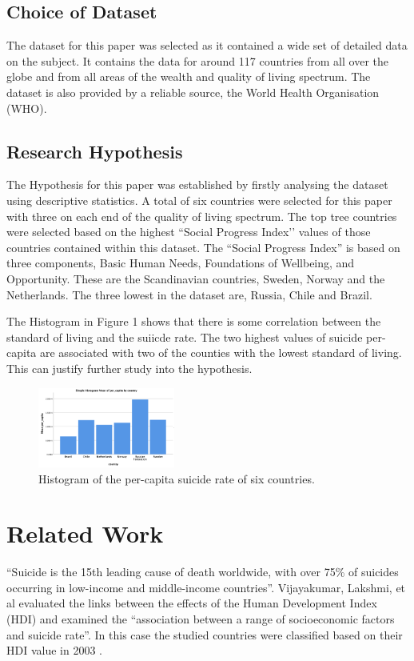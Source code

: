 \documentclass[conference]{IEEEtran}
\begin{document}
\subsection{Choice of Dataset}
The dataset for this paper was selected as it contained a wide set of detailed data on the subject.
It contains the data for around 117 countries from all over the globe and from all areas of the wealth and quality of living spectrum.
The dataset is also provided by a reliable source, the World Health Organisation (WHO).

\subsection{Research Hypothesis}
The Hypothesis for this paper was established by firstly analysing the dataset using descriptive statistics.
A total of six countries were selected for this paper with three on each end of the quality of living spectrum.
The top tree countries were selected based on the highest ``Social Progress Index’’ values of those countries contained within this dataset.
The ``Social Progress Index'' is based on three components, Basic Human Needs, Foundations of Wellbeing, and Opportunity\cite{high_standard_living}.
These are the Scandinavian countries, Sweden, Norway and the Netherlands.
The three lowest in the dataset are, Russia, Chile and Brazil.

The Histogram in Figure 1 shows that there is some correlation between the standard of living and the suiicde rate.
The two highest values of suicide per-capita are associated with two of the counties with the lowest standard of living.
This can justify further study into the hypothesis.
\newline
    \begin{figure}[b]
        \centering
        \includegraphics[width=0.4\textwidth]{percapita_bar}
        \caption{Histogram of the per-capita suicide rate of six countries.}
    \end{figure}

\section{Related Work}
``Suicide is the 15th leading cause of death worldwide, with over 75\% of suicides occurring in low-income and middle-income countries''\cite{sui_low_income}.
Vijayakumar, Lakshmi, et al evaluated the links between the effects of the Human Development Index (HDI) and examined the
``association between a range of socioeconomic factors and suicide rate''.
In this case the studied countries were classified based on their HDI value in 2003 \cite{Sui_in_developing}.
\end{document}
